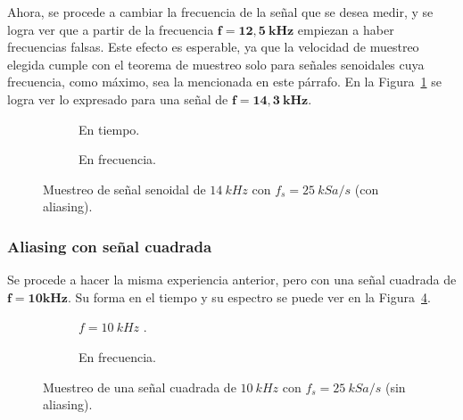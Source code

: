       Ahora, se procede a cambiar la frecuencia de la señal que se desea medir, y se logra ver que
      a partir de la frecuencia $\mathbf{f = 12,5~kHz}$ empiezan a haber frecuencias falsas. Este
      efecto es esperable, ya que la velocidad de muestreo elegida cumple con el teorema de muestreo
      solo para señales senoidales cuya frecuencia, como máximo, sea la mencionada en este párrafo. En
      la Figura~\ref{fig:Exp3SeñalConAlias} se logra ver lo expresado para una señal de $\mathbf{f=14,3~kHz}$.



      \begin{figure}[H]
        \centering
        \begin{subfigure}[H]{0.42\textwidth}
          \caption{En tiempo.}
        \end{subfigure}
        \hfill 
        \begin{subfigure}[H]{0.40\textwidth}
          \caption{En frecuencia.}
        \end{subfigure}

        \caption{Muestreo de señal senoidal de $14~kHz$ con $f_s=25~kSa/s$ (con aliasing).}
        \label{fig:Exp3SeñalConAlias}
      \end{figure}

      \subsubsection{Aliasing con señal cuadrada}
      Se procede a hacer la misma experiencia anterior, pero con una señal cuadrada de $\mathbf{f=10kHz}$.
      Su forma en el tiempo y su espectro se puede ver en la Figura~\ref{fig:Exp3SeñalCuad10k}.

      \begin{figure}[H]
        \centering
        \begin{subfigure}[H]{0.41\textwidth}
          \caption{$f=10~kHz$ .}
          \label{En tiempo.}
        \end{subfigure}
        \hfill 
        \begin{subfigure}[H]{0.38\textwidth}
          \caption{En frecuencia.}
          \label{fig:Exp3EspectroSeñalCuad}
        \end{subfigure}

        \caption{Muestreo de una señal cuadrada de $10~kHz$ con $f_s=25~kSa/s$ (sin aliasing).}
        \label{fig:Exp3SeñalCuad10k}
      \end{figure}

